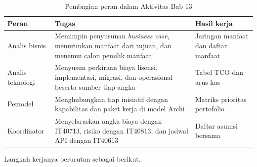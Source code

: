 \begin{table}[!htb]
  \centering
  \caption{Pembagian peran dalam Aktivitas Bab 13}
  \label{tab:ch13-peran}
  \footnotesize
  \begin{tabularx}{\textwidth}{>{\raggedright\arraybackslash}p{2.2cm}
                               >{\raggedright\arraybackslash}X
                               >{\raggedright\arraybackslash}p{3.2cm}}
    \hline
    \textbf{Peran} & \textbf{Tugas} & \textbf{Hasil kerja} \\
    \hline
    Analis bisnis & Memimpin penyusunan \textit{business case}, menurunkan
      manfaat dari tujuan, dan menemui calon pemilik manfaat & Jaringan
      manfaat dan daftar manfaat \\
    \hline
    Analis teknologi & Menyusun perkiraan biaya lisensi, implementasi,
      migrasi, dan operasional beserta sumber tiap angka & Tabel TCO dan arus
      kas \\
    \hline
    Pemodel & Menghubungkan tiap inisiatif dengan kapabilitas dan paket kerja
      di model Archi & Matriks prioritas portofolio \\
    \hline
    Koordinator & Menyelaraskan angka biaya dengan IT40713, risiko dengan
      IT40813, dan jadwal API dengan IT40613 & Daftar asumsi bersama \\
    \hline
  \end{tabularx}
\end{table}

Langkah kerjanya berurutan sebagai berikut.

